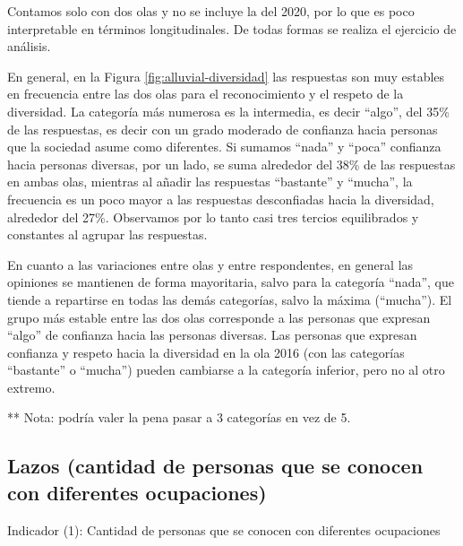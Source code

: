 \documentclass[
  12pt,
]{book}
\begin{document}
Contamos solo con dos olas y no se incluye la del 2020, por lo que es poco interpretable en términos longitudinales. De todas formas se realiza el ejercicio de análisis.

En general, en la Figura \ref{fig:alluvial-diversidad} las respuestas son muy estables en frecuencia entre las dos olas para el reconocimiento y el respeto de la diversidad. La categoría más numerosa es la intermedia, es decir ``algo'', del 35\% de las respuestas, es decir con un grado moderado de confianza hacia personas que la sociedad asume como diferentes. Si sumamos ``nada'' y ``poca'' confianza hacia personas diversas, por un lado, se suma alrededor del 38\% de las respuestas en ambas olas, mientras al añadir las respuestas ``bastante'' y ``mucha'', la frecuencia es un poco mayor a las respuestas desconfiadas hacia la diversidad, alrededor del 27\%. Observamos por lo tanto casi tres tercios equilibrados y constantes al agrupar las respuestas.

En cuanto a las variaciones entre olas y entre respondentes, en general las opiniones se mantienen de forma mayoritaria, salvo para la categoría ``nada'', que tiende a repartirse en todas las demás categorías, salvo la máxima (``mucha''). El grupo más estable entre las dos olas corresponde a las personas que expresan ``algo'' de confianza hacia las personas diversas. Las personas que expresan confianza y respeto hacia la diversidad en la ola 2016 (con las categorías ``bastante'' o ``mucha'') pueden cambiarse a la categoría inferior, pero no al otro extremo.

** Nota: podría valer la pena pasar a 3 categorías en vez de 5.

\hypertarget{lazos-cantidad-de-personas-que-se-conocen-con-diferentes-ocupaciones}{%
\subsection{Lazos (cantidad de personas que se conocen con diferentes ocupaciones)}\label{lazos-cantidad-de-personas-que-se-conocen-con-diferentes-ocupaciones}}

Indicador (1): Cantidad de personas que se conocen con diferentes ocupaciones
\end{document}
